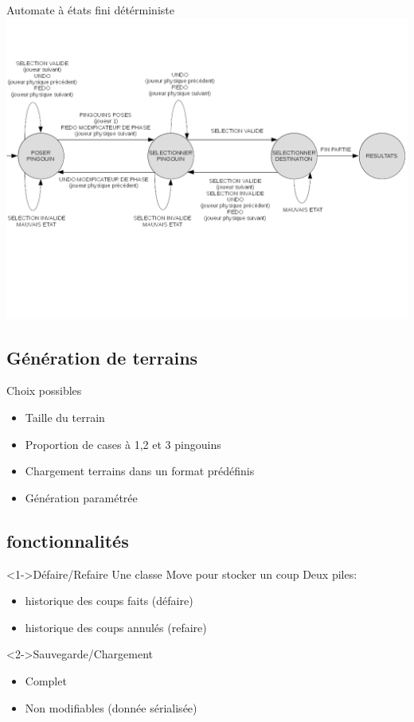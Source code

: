 \documentclass{beamer}
\begin{document}
\begin{frame}{Automate à états fini détérministe}
\includegraphics[scale=0.4]{AFD}
\end{frame}

\subsection{Génération de terrains}

\begin{frame}{}
\begin{block}{Choix possibles}
\begin{itemize}
\item<1-> Taille du terrain
\item<2-> Proportion de cases à 1,2 et 3 pingouins
\item<3-> Chargement terrains dans un format prédéfinis
\item<4-> Génération paramétrée
\end{itemize}
\end{block}
\end{frame}

\subsection{fonctionnalités}
\begin{frame}{}
\begin{block}<1->{Défaire/Refaire} %
Une classe Move pour stocker un coup \newline
Deux piles: 
\begin{itemize}
 \item historique des coups faits (défaire)
 \item historique des coups annulés (refaire)
\end{itemize}
\end{block}
\begin{block}<2->{Sauvegarde/Chargement}
\begin{itemize}
\item Complet
\item Non modifiables (donnée sérialisée)
\end{itemize}
\end{block}
\end{frame}
\end{document}
